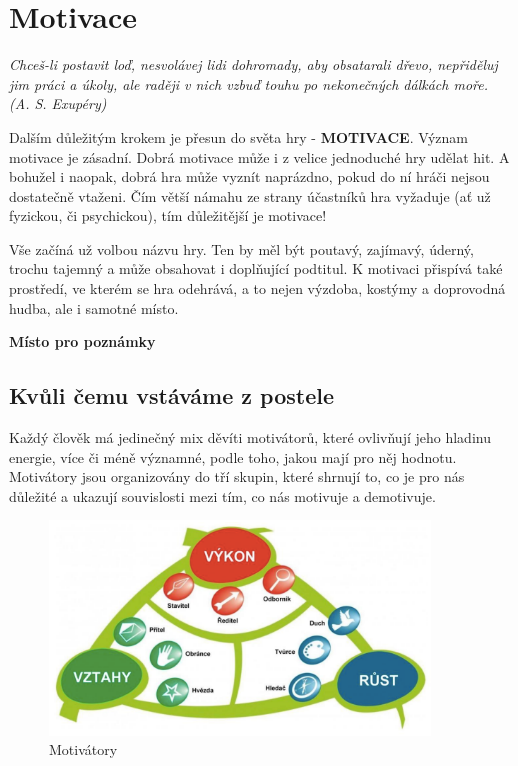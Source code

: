 \documentclass[a4paper,12pt]{report}
\begin{document}
\newpage
\pagelogos
\chapter[Motivace]{Motivace}
\textit{Chceš-li postavit loď, nesvolávej lidi dohromady, aby obsatarali dřevo, nepřiděluj jim práci a úkoly, ale raději v nich vzbuď touhu po nekonečných dálkách moře. (A. S. Exupéry)}

Dalším důležitým krokem je přesun do světa hry - \textbf{MOTIVACE}. Význam motivace je zásadní. Dobrá motivace může i z velice jednoduché hry udělat hit. A bohužel i naopak, dobrá hra může vyznít naprázdno, pokud do ní hráči nejsou dostatečně vtaženi. Čím větší námahu ze strany účastníků hra vyžaduje (ať už fyzickou, či psychickou), tím důležitější je motivace!

Vše začíná už volbou názvu hry. Ten by měl být poutavý, zajímavý, úderný, trochu tajemný a může obsahovat i doplňující podtitul. K motivaci přispívá také prostředí, ve kterém se hra odehrává, a to nejen výzdoba, kostýmy a doprovodná hudba, ale i samotné místo.


\begin{samepage}\begin{flushleft}
\end{flushleft}
\textbf{Místo pro poznámky}
\vspace{7cm}
\end{samepage}

\section[Kvůli čemu vstáváme z postele]{Kvůli čemu vstáváme z postele}
Každý člověk má jedinečný mix děvíti motivátorů, které ovlivňují jeho hladinu energie, více či méně významné, podle toho, jakou mají pro něj hodnotu. Motivátory jsou organizovány do tří skupin, které shrnují to, co je pro nás důležité a ukazují souvislosti mezi tím, co nás motivuje a demotivuje.

\newpage

\pagelogos
\begin{figure}[hp!]
\begin{center}
\includegraphics[width=0.9\textwidth]{zdroje/motivace1.png}
\caption{Motivátory}
\end{center}
\end{figure}
\end{document}
